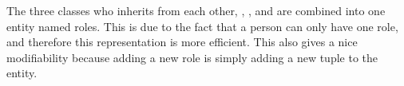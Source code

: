 The three classes who inherits from each other, \client[], \staff[], and \admin[] are combined into one entity named roles.
This is due to the fact that a person can only have one role, and therefore this representation is more efficient.
This also gives a nice modifiability because adding a new role is simply adding a new tuple to the entity. 
